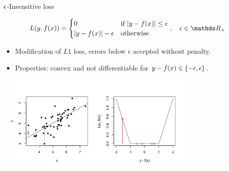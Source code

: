 \begin{vbframe}{$\epsilon$-Insensitive loss}

\vspace*{-0.3cm}
$$
\Lxy =  \begin{cases}
  0  & \text{if } |y - \fx| \le \epsilon \\
  |y - \fx|-\epsilon & \text{otherwise }
  \end{cases}, \quad \epsilon \in \R_{+}
$$
\begin{itemize}
\item Modification of $L1$ loss, errors below $\epsilon$ accepted without penalty.
\item Properties: convex and not differentiable for $ y - f(x) \in \{-\epsilon, \epsilon\}$.
\end{itemize}

\begin{center}
\includegraphics[width = 10cm, height = 4.7cm]{figure_man/2_6_loss_epsilon_plot1.png} \\
\end{center}

\end{vbframe}


